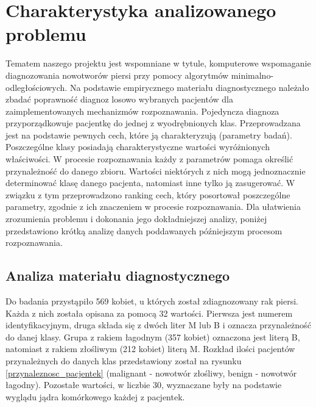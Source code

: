 \documentclass[12pt]{article}
\begin{document}
\section{Charakterystyka analizowanego problemu}
Tematem naszego projektu jest wspomniane w tytule, komputerowe wspomaganie diagnozowania nowotworów piersi przy pomocy algorytmów minimalno-odległościowych. Na podstawie empirycznego materiału diagnostycznego należało zbadać poprawność diagnoz losowo wybranych pacjentów dla zaimplementowanych mechanizmów rozpoznawania.
\newline
\indent Pojedyncza diagnoza przyporządkowuje pacjentkę do jednej z wyodrębnionych klas. Przeprowadzana jest na podstawie pewnych cech, które ją charakteryzują (parametry badań). Poszczególne klasy posiadają charakterystyczne wartości wyróżnionych właściwości. W procesie rozpoznawania każdy z parametrów pomaga określić przynależność do danego zbioru. Wartości niektórych z nich mogą jednoznacznie determinować klasę danego pacjenta, natomiast inne tylko ją zasugerować. W związku z tym przeprowadzono ranking cech, który posortował poszczególne parametry, zgodnie z ich znaczeniem w procesie rozpoznawania. 
\newline \indent Dla ułatwienia zrozumienia problemu i dokonania jego dokładniejszej analizy, poniżej przedstawiono krótką analizę danych poddawanych późniejszym procesom rozpoznawania.


\subsection{Analiza materiału diagnostycznego}
\indent Do badania przystąpiło 569 kobiet, u których został zdiagnozowany rak piersi. Każda z nich została opisana za pomocą 32 wartości. Pierwsza jest numerem identyfikacyjnym, druga składa się z dwóch liter M lub B i oznacza przynależność do danej klasy.  Grupa z rakiem łagodnym (357 kobiet) oznaczona jest literą B, natomiast z rakiem złośliwym (212 kobiet) literą M. Rozkład ilości pacjentów przynależnych do danych klas przedstawiony został na rysunku \ref{przynaleznosc_pacjentek} (malignant - nowotwór złośliwy, benign - nowotwór łagodny). Pozostałe wartości, w liczbie 30, wyznaczane były na podstawie wyglądu jądra komórkowego każdej z pacjentek.
\newline
\end{document}
